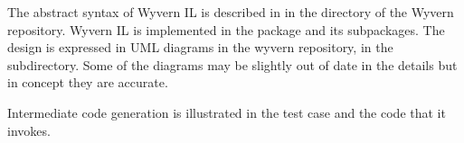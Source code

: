 \documentclass{article}
\begin{document}
\begin{mdP}[class={indent},data-line={193}]%
{}The abstract syntax of Wyvern IL is described in
{}%
{} in the %
{}%
{} directory of the Wyvern %
{}%
{}
repository.  Wyvern IL is implemented in the
{}%
{} package and its subpackages.
The design is expressed in UML diagrams in the wyvern repository,
in the %
{}%
{} subdirectory.  Some of the diagrams may be
slightly out of date in the details but in concept they are
accurate.%
\end{mdP}%
\begin{mdP}[class={indent},data-line={202}]%
{}Intermediate code generation is illustrated in the test case
{}%
{} and the code that
it invokes.%
\end{mdP}%
\end{document}
